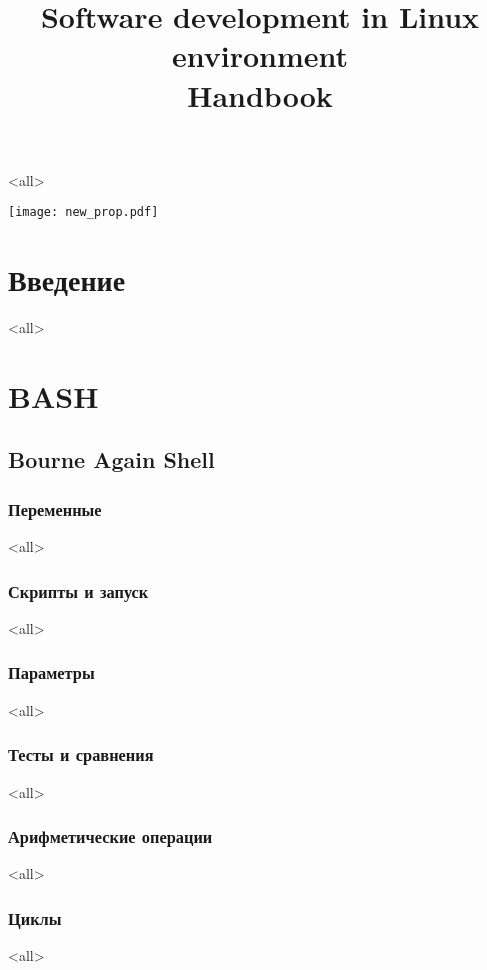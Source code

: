 

\title{Software development in Linux environment\\Handbook}

\mode<all>{}



\maketitle

\texttt{[image: new\_prop.pdf]}

\color{black}{\tableofcontents}


\part{Введение}

\mode<all>{}


\part{BASH}
\chapter*{Bourne Again Shell}
\section{Переменные}
\mode<all>{}
\section{Скрипты и запуск}
\mode<all>{}
\section{Параметры}
\mode<all>{}
\section{Тесты и сравнения}
\mode<all>{}
\section{Арифметические операции}
\mode<all>{}
\section{Циклы}
\mode<all>{}
